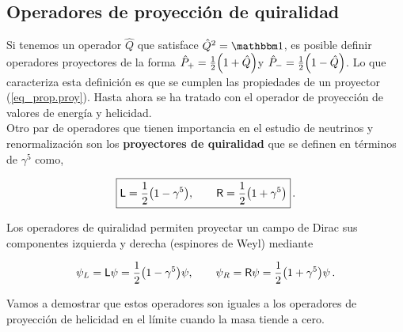 \subsection{Operadores de proyección de quiralidad}
Si tenemos un operador $\hat{Q}$ que satisface $\hat{Q}^2 = \idnt$, es posible definir operadores proyectores de la forma $\hat{P}_+ = \frac{1}{2} \qty( 1+\hat{Q} ) $y $\hat{P}_- = \frac{1}{2} \qty( 1-\hat{Q} ) $. Lo que caracteriza esta definición es que se cumplen las propiedades de un proyector (\ref{eq_prop.proy}). Hasta ahora se ha tratado con el operador de proyección de valores de energía y helicidad.\\

Otro par de operadores que tienen importancia en el estudio de neutrinos y renormalización son los \textbf{proyectores de quiralidad} que se definen en términos de $\gamma^5$ como,

\begin{equation}
	\boxed{	\mathsf{L} = \frac{1}{2} \qty(1-\gamma^5), \qquad \mathsf{R} = \frac{1}{2} \qty(1+\gamma^5)  }\, .
\end{equation}

Los operadores de quiralidad permiten proyectar un campo de Dirac sus componentes izquierda y derecha (espinores de Weyl) mediante

\begin{equation}
	\psi_L = \mathsf{L} \psi = \frac{1}{2} \qty(1-\gamma^5)\psi, \qquad \psi_R = \mathsf{R} \psi = \frac{1}{2} \qty(1+\gamma^5)\psi \,.
\end{equation}

Vamos a demostrar que estos operadores son iguales a los operadores de proyección de helicidad en el límite cuando la masa tiende a cero.

